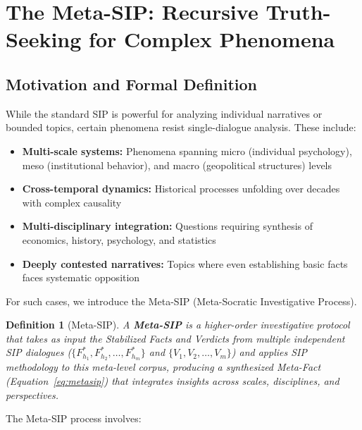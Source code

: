 \documentclass[11pt,a4paper]{article}
\newtheorem{definition}{Definition}[section]
\begin{document}
\section{The Meta-SIP: Recursive Truth-Seeking for Complex Phenomena}

\subsection{Motivation and Formal Definition}

While the standard SIP is powerful for analyzing individual narratives or bounded topics, certain phenomena resist single-dialogue analysis. These include:

\begin{itemize}[nosep]
    \item \textbf{Multi-scale systems:} Phenomena spanning micro (individual psychology), meso (institutional behavior), and macro (geopolitical structures) levels
    \item \textbf{Cross-temporal dynamics:} Historical processes unfolding over decades with complex causality
    \item \textbf{Multi-disciplinary integration:} Questions requiring synthesis of economics, history, psychology, and statistics
    \item \textbf{Deeply contested narratives:} Topics where even establishing basic facts faces systematic opposition
\end{itemize}

For such cases, we introduce the Meta-SIP (Meta-Socratic Investigative Process).

\begin{definition}[Meta-SIP]
A \textbf{Meta-SIP} is a higher-order investigative protocol that takes as input the Stabilized Facts and Verdicts from multiple independent SIP dialogues ($\{F_{h_1}^*, F_{h_2}^*, \ldots, F_{h_m}^*\}$ and $\{V_1, V_2, \ldots, V_m\}$) and applies SIP methodology to this meta-level corpus, producing a synthesized Meta-Fact (Equation~\ref{eq:metasip}) that integrates insights across scales, disciplines, and perspectives.
\end{definition}

The Meta-SIP process involves:
\end{document}
